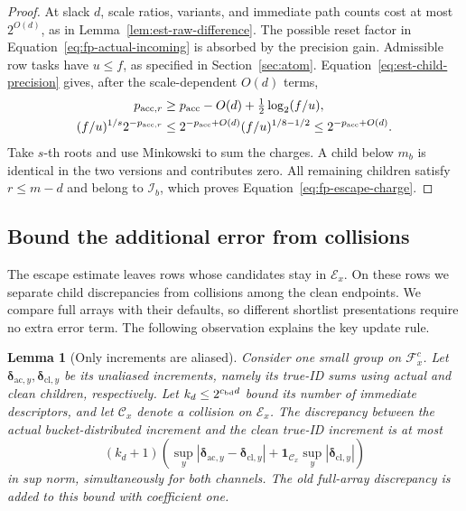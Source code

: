 \documentclass[11pt]{article}
\numberwithin{equation}{section}
\newtheorem{lemma}[theorem]{Lemma}
\theoremstyle{definition}
\theoremstyle{remark}
\begin{document}
\begin{proof}
At slack $d$, scale ratios, variants, and immediate path counts cost at
most $2^{O(d)}$, as in Lemma~\ref{lem:est-raw-difference}.  The possible
reset factor in Equation~\eqref{eq:fp-actual-incoming} is absorbed by the
precision gain.  Admissible row tasks have $u\le f$, as specified in
Section~\ref{sec:atom}.  Equation~\eqref{eq:est-child-precision} gives,
after the scale-dependent $O(d)$ terms,
\begin{align*}
 {p_{\mathrm{acc},r}}&\ge {p_{\rm acc}}-O(d)+\tfrac12\log_2(f/u),\\
 (f/u)^{1/s}2^{-{p_{\mathrm{acc},r}}}
 &\le 2^{-{p_{\rm acc}}+O(d)}(f/u)^{1/8-1/2}
 \le 2^{-{p_{\rm acc}}+O(d)}.
\end{align*}
Take $s$-th roots and use Minkowski to sum the charges.  A child below
${m}_b$ is identical in the two versions and contributes zero.  All
remaining children satisfy ${r}\le {m}-d$ and belong to $\mathcal I_b$,
which proves Equation~\eqref{eq:fp-escape-charge}.
\end{proof}

\subsection{Bound the additional error from collisions}

The escape estimate leaves rows whose candidates stay in
$\mathcal E_x$.  On these rows we separate child discrepancies from
collisions among the clean endpoints.  We compare full arrays with
their defaults, so different shortlist presentations require no extra
error term.  The following observation explains the key update rule.

\begin{lemma}[Only increments are aliased]\label{lem:fp-buckets}
Consider one small group on $\mathcal F_x^c$.  Let
$\boldsymbol{\delta}_{\mathrm{ac},y},\boldsymbol{\delta}_{\mathrm{cl},y}$ be its unaliased
increments, namely its true-ID sums using actual and clean children,
respectively.  Let $k_d\le2^{{c_{\rm bd}} d}$ bound its number of immediate
descriptors, and let $\mathcal C_x$ denote a collision on $\mathcal E_x$.
The discrepancy between the actual bucket-distributed increment and
the clean true-ID increment is at most
\begin{equation}
 (k_d+1)\left(
       \sup_y|\boldsymbol{\delta}_{\mathrm{ac},y}-\boldsymbol{\delta}_{\mathrm{cl},y}|
       +\mathbf1_{\mathcal C_x}\sup_y|\boldsymbol{\delta}_{\mathrm{cl},y}|
                  \right)
 \label{eq:fp-bucket-bound}
\end{equation}
in sup norm, simultaneously for both channels.  The old full-array
discrepancy is added to this bound with coefficient one.
\end{lemma}
\end{document}
